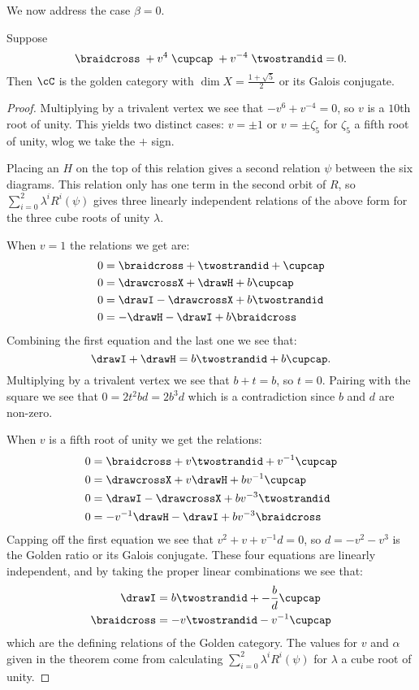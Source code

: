 \documentclass[12pt]{amsart}
\begin{document}
We now address the case $\beta = 0$.

\begin{lemma} \label{lem:betazero}
  Suppose
  \begin{equation}\label{eq:golden-rel}
    \braidcross \; + v^{4}\;\cupcap\; + v^{-4} \; \twostrandid = 0.
  \end{equation}
  Then $\cC$ is the golden category with $\dim X = \frac{1 + \sqrt{5}}{2}$ or its Galois conjugate.  
\end{lemma}
\begin{proof}
Multiplying by a trivalent vertex we see that $-v^6+v^{-4}=0$, so $v$ is a
$10$th root of unity.  This yields two distinct cases: $v= \pm 1$ or $v = \pm
\zeta_5$ for $\zeta_5$ a fifth root of unity, wlog we take the $+$ sign.

Placing an $H$ on the top of this relation gives a second relation $\psi$
between the six diagrams.  This relation only has one term in the second orbit
of $R$, so $\sum_{i=0}^2 \lambda^i R^i(\psi)$ gives three linearly independent
relations of the above form for the three cube roots of unity $\lambda$.

When $v=1$ the relations we get are:
\begin{align*}
0 &= \braidcross + \twostrandid + \cupcap \\
0 &= \drawcrossX +\drawH + b\cupcap \\
0 &= \drawI - \drawcrossX + b\twostrandid \\
0 &= -\drawH -\drawI + b \braidcross
\end{align*}
Combining the first equation and the last one we see that:
$$\drawI+\drawH = b \twostrandid + b\cupcap.$$
Multiplying by a trivalent vertex we see that $b+t=b$, so $t = 0$.  Pairing
with the square we see that $0 = 2t^2 bd = 2b^3 d$ which is a contradiction
since $b$ and $d$ are non-zero.

When $v$ is a fifth root of unity we get the relations:
\begin{align*}
0 &= \braidcross + v\twostrandid + v^{-1}\cupcap \\
0 &= \drawcrossX +v \drawH + b v^{-1}\cupcap \\
0 &= \drawI - \drawcrossX + b v^{-3} \twostrandid \\
0 &= -v^{-1} \drawH -\drawI + b v^{-3} \braidcross
\end{align*}
Capping off the first equation we see that $v^2 + v +v^{-1}d = 0$, so $d =
-v^2-v^3$ is the Golden ratio or its Galois conjugate.  These four equations
are linearly independent, and by taking the proper linear combinations we see
that:
\begin{align*}
\drawI &=  b\twostrandid + -\frac{b}{d} \cupcap \\
\braidcross &= -v\twostrandid -v^{-1} \cupcap \\
\end{align*}
which are the defining relations of the Golden category.  The values for $v$ and $\alpha$ given in the theorem come from calculating $\sum_{i=0}^2 \lambda^i R^i(\psi)$ for $\lambda$ a cube root of unity.
\end{proof}
\end{document}

